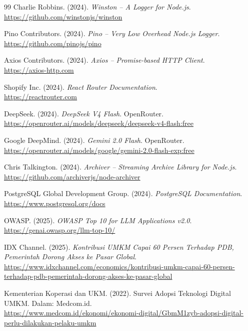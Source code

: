 \documentclass[12pt,a4paper,oneside]{article}
\begin{document}
\begin{thebibliography}{99}
	Charlie Robbins. (2024). \textit{Winston -- A Logger for Node.js}. \\
	\url{https://github.com/winstonjs/winston}

	Pino Contributors. (2024). \textit{Pino -- Very Low Overhead Node.js Logger}. \\
	\url{https://github.com/pinojs/pino}

	Axios Contributors. (2024). \textit{Axios -- Promise-based HTTP Client}. \\
	\url{https://axios-http.com}

	Shopify Inc. (2024). \textit{React Router Documentation}. \\
	\url{https://reactrouter.com}

	DeepSeek. (2024). \textit{DeepSeek V4 Flash}. OpenRouter. \\
	\url{https://openrouter.ai/models/deepseek/deepseek-v4-flash:free}

	Google DeepMind. (2024). \textit{Gemini 2.0 Flash}. OpenRouter. \\
	\url{https://openrouter.ai/models/google/gemini-2.0-flash-exp:free}

	Chris Talkington. (2024). \textit{Archiver -- Streaming Archive Library for Node.js}. \\
	\url{https://github.com/archiverjs/node-archiver}

	PostgreSQL Global Development Group. (2024). \textit{PostgreSQL Documentation}. \\
	\url{https://www.postgresql.org/docs}

	OWASP. (2025). \textit{OWASP Top 10 for LLM Applications v2.0}. \\
	\url{https://genai.owasp.org/llm-top-10/}

	IDX Channel. (2025). \textit{Kontribusi UMKM Capai 60 Persen Terhadap PDB, Pemerintah Dorong Akses ke Pasar Global}. \\
	\url{https://www.idxchannel.com/economics/kontribusi-umkm-capai-60-persen-terhadap-pdb-pemerintah-dorong-akses-ke-pasar-global}

	Kementerian Koperasi dan UKM. (2022). Survei Adopsi Teknologi Digital UMKM. Dalam: Medcom.id. \\
	\url{https://www.medcom.id/ekonomi/ekonomi-digital/GbmM1zyb-adopsi-digital-perlu-dilakukan-pelaku-umkm}


\end{thebibliography}
\end{document}
